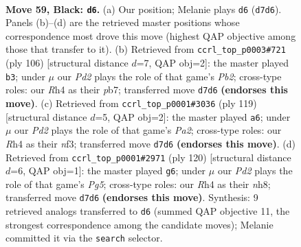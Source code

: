 \documentclass[11pt]{article}
\begin{document}
\clearpage

\begin{figure}[p]\centering
\begin{subfigure}{0.46\textwidth}\centering
\resizebox{\linewidth}{!}{%
\newchessgame
\chessboard[
  setfen={8/p2p4/2p5/5k2/7r/5K2/8/8 b - - 5 59},
  showmover=false,
  pgfstyle=straightmove, color=movearrow, markmove={d7-d6}
]}
\caption{}
\end{subfigure}\hfill
\begin{subfigure}{0.46\textwidth}\centering
\resizebox{\linewidth}{!}{%
\newchessgame
\chessboard[
  setfen={8/pp6/3k4/5K2/8/2P5/1P6/8 w - - 1 54},
  showmover=false,
  pgfstyle=straightmove, color=movearrow, markmove={b2-b3}
]}
\caption{}
\end{subfigure}
\\[4pt]
\begin{subfigure}{0.46\textwidth}\centering
\resizebox{\linewidth}{!}{%
\newchessgame
\chessboard[
  setfen={8/p7/1p6/3k4/8/1P1K1N2/8/8 b - - 4 60},
  showmover=false,
  pgfstyle=straightmove, color=movearrow, markmove={a7-a6}
]}
\caption{}
\end{subfigure}\hfill
\begin{subfigure}{0.46\textwidth}\centering
\resizebox{\linewidth}{!}{%
\newchessgame
\chessboard[
  setfen={7n/1k6/5P2/6P1/8/2p1K3/8/8 w - - 1 61},
  showmover=false,
  pgfstyle=straightmove, color=movearrow, markmove={g5-g6}
]}
\caption{}
\end{subfigure}
\caption{\textbf{Move 59, Black: \texttt{d6}.} (a) Our position; Melanie plays \texttt{d6} (\texttt{d7d6}). Panels (b)--(d) are the retrieved master positions whose correspondence most drove this move (highest QAP objective among those that transfer to it). (b) Retrieved from \texttt{ccrl\_top\_p0003\#721} (ply 106) [structural distance $d$=7, QAP obj=2]: the master played \texttt{b3}; under $\mu$ our \emph{Pd2} plays the role of that game's \emph{Pb2}; cross-type roles: our \emph{R}h4 as their \emph{p}b7; transferred move \texttt{d7d6} \textbf{(endorses this move)}. (c) Retrieved from \texttt{ccrl\_top\_p0001\#3036} (ply 119) [structural distance $d$=5, QAP obj=2]: the master played \texttt{a6}; under $\mu$ our \emph{Pd2} plays the role of that game's \emph{Pa2}; cross-type roles: our \emph{R}h4 as their \emph{n}f3; transferred move \texttt{d7d6} \textbf{(endorses this move)}. (d) Retrieved from \texttt{ccrl\_top\_p0001\#2971} (ply 120) [structural distance $d$=6, QAP obj=1]: the master played \texttt{g6}; under $\mu$ our \emph{Pd2} plays the role of that game's \emph{Pg5}; cross-type roles: our \emph{R}h4 as their \emph{n}h8; transferred move \texttt{d7d6} \textbf{(endorses this move)}. Synthesis: 9 retrieved analogs transferred to \texttt{d6} (summed QAP objective 11, the strongest correspondence among the candidate moves); Melanie committed it via the \texttt{search} selector.}
\label{fig:thought-m117}
\end{figure}
\end{document}
